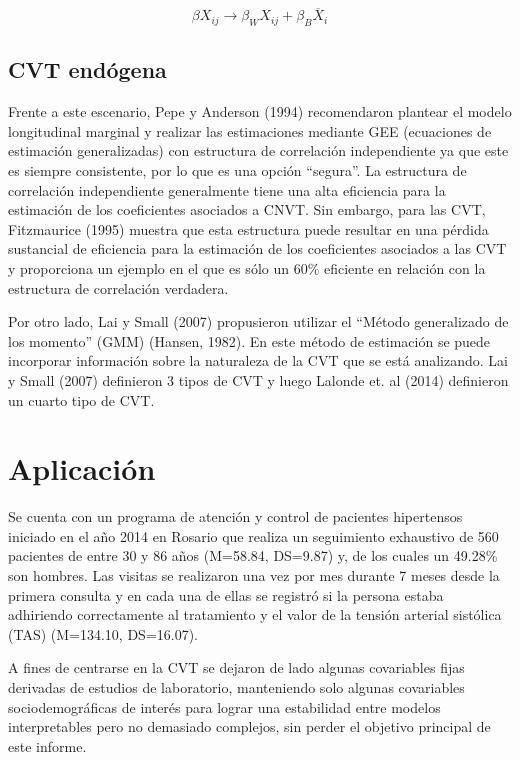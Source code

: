 \documentclass[spanish]{article}
\numberwithin{figure}{subsection}
\numberwithin{equation}{subsection}
\numberwithin{table}{subsection}
\def\npatients{560}
\begin{document}
\[
	\beta X_{ij} \rightarrow \beta_W X_{ij} + \beta_B \overline{X}_i
\]

\subsection{CVT endógena}

Frente a este escenario, Pepe y Anderson (1994) recomendaron plantear el modelo
longitudinal marginal y realizar las estimaciones mediante GEE (ecuaciones de
estimación generalizadas) con estructura de correlación independiente ya que
este es siempre consistente, por lo que es una opción ``segura''. La estructura
de correlación independiente generalmente tiene una alta eficiencia para la
estimación de los coeficientes asociados a CNVT. Sin embargo, para las CVT,
Fitzmaurice (1995) muestra que esta estructura puede resultar en una pérdida
sustancial de eficiencia para la estimación de los coeficientes asociados a las
CVT y proporciona un ejemplo en el que es sólo un 60\% eficiente en relación con
la estructura de correlación verdadera.

Por otro lado, Lai y Small (2007) propusieron utilizar el ``Método generalizado
de los momento'' (GMM) (Hansen, 1982). En este método de estimación se puede
incorporar información sobre la naturaleza de la CVT que se está analizando. Lai
y Small (2007) definieron 3 tipos de CVT y luego Lalonde et. al (2014)
definieron un cuarto tipo de CVT. 

\newpage

\section{Aplicación}

Se cuenta con un programa de atención y control de pacientes hipertensos
iniciado en el año 2014 en Rosario que realiza un seguimiento exhaustivo de
\npatients{} pacientes de entre 30 y 86 años (M=58.84, DS=9.87) y, de los
cuales un 49.28\% son hombres. Las visitas se realizaron una vez por mes
durante 7 meses desde la primera consulta y en cada una de ellas se registró si
la persona estaba adhiriendo correctamente al tratamiento y el valor de la
tensión arterial sistólica (TAS) (M=134.10, DS=16.07).

A fines de centrarse en la CVT se dejaron de lado algunas covariables fijas
derivadas de estudios de laboratorio, manteniendo solo algunas covariables
sociodemográficas de interés para lograr una estabilidad entre modelos
interpretables pero no demasiado complejos, sin perder el objetivo principal de
este informe.
\end{document}
